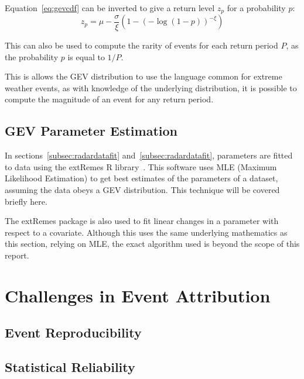 \documentclass[12pt,a4paper]{report}
\begin{document}
Equation~\ref{eq:gevcdf} can be inverted to give a return level $z_p$ for a probability $p$:
\begin{equation}\label{eq:gevreturn}
    z_p = \mu - \frac{\sigma}{\xi}\left( 1-\left( -\log\left( 1-p \right) \right)^{-\xi} \right)
\end{equation}

This can also be used to compute the rarity of events for each return period $P$,
    as the probability $p$ is equal to $1/P$.

This is allows the GEV distribution to use the language common for extreme weather events,
    as with knowledge of the underlying distribution,
    it is possible to compute the magnitude of an event for any return period.

\subsection{GEV Parameter Estimation}\label{subsec:parameterest}

In sections~\ref{subsec:radardatafit} and~\ref{subsec:radardatafit},
    parameters are fitted to data using the extRemes R library~\cite{extremes_R}.
This software uses MLE (Maximum Likelihood Estimation) to get best estimates of the parameters of a dataset,
    assuming the data obeys a GEV distribution.
This technique will be covered briefly here.

The extRemes package is also used to fit linear changes in a parameter with respect to a covariate.
Although this uses the same underlying mathematics as this section,
    relying on MLE,
    the exact algorithm used is beyond the scope of this report.

\subsubsection{}

\section{Challenges in Event Attribution}\label{sec:attrchallenge}

\subsection{Event Reproducibility}\label{subsec:eventrepro}

\subsection{Statistical Reliability}\label{subsec:statvalid}
\end{document}
